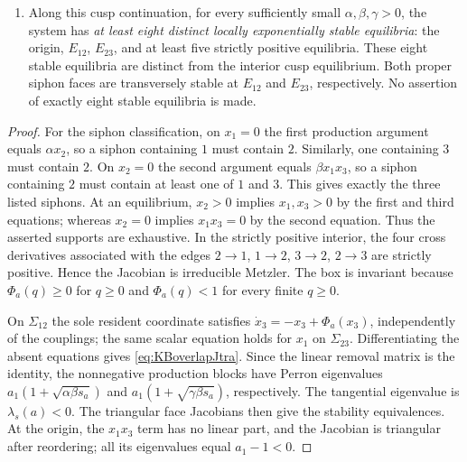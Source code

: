 \begin{enumerate}
\item Along this cusp continuation, for every sufficiently
small $\alpha,\beta,\gamma>0$, the system has
\emph{at least eight distinct locally exponentially stable
equilibria}: the origin, $E_{12}$, $E_{23}$, and at least
five strictly positive equilibria. These eight stable
equilibria are distinct from the interior cusp equilibrium.
Both proper siphon faces are transversely stable at
$E_{12}$ and $E_{23}$, respectively. No assertion of
exactly eight stable equilibria is made.
\end{enumerate}
\eeT

\begin{proof}
For the siphon classification, on $x_1=0$ the first
production argument equals $\alpha x_2$, so a siphon
containing $1$ must contain $2$. Similarly, one containing
$3$ must contain $2$. On $x_2=0$ the second argument equals
$\beta x_1x_3$, so a siphon containing $2$ must contain
at least one of $1$ and $3$. This gives exactly the three
listed siphons. At an equilibrium, $x_2>0$ implies
$x_1,x_3>0$ by the first and third equations; whereas
$x_2=0$ implies $x_1x_3=0$ by the second equation.
Thus the asserted supports are exhaustive. In the strictly
positive interior, the four cross derivatives associated
with the edges $2\to1$, $1\to2$, $3\to2$, $2\to3$ are
strictly positive. Hence the Jacobian is irreducible Metzler.
The box is invariant because $\Phi_a(q)\ge0$ for $q\ge0$ and
$\Phi_a(q)<1$ for every finite $q\ge0$.

On $\Sigma_{12}$ the sole resident coordinate satisfies
$\dot x_3=-x_3+\Phi_a(x_3)$, independently of the couplings;
the same scalar equation holds for $x_1$ on $\Sigma_{23}$.
Differentiating the absent equations gives
\eqref{eq:KBoverlapJtra}. Since the linear removal matrix
is the identity, the nonnegative production blocks have
Perron eigenvalues
$a_1(1+\sqrt{\alpha\beta s_a})$ and
$a_1(1+\sqrt{\gamma\beta s_a})$, respectively.
The tangential eigenvalue is $\lambda_s(a)<0$.
The triangular face Jacobians then give the stability
equivalences. At the origin, the $x_1x_3$ term has no
linear part, and the Jacobian is triangular after reordering;
all its eigenvalues equal $a_1-1<0$.


\end{proof}
